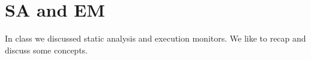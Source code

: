 
\graphicspath{ {./src/} } 
\usepackage{hyperref}

\newcommand{\dozent}{Volker Roth}
\newcommand{\tutor}{Oliver Wiese}
\newcommand{\tutoriumNo}{02\\Materialien: Latex, VSC, Skript}
\newcommand{\ubungNo}{03}
\newcommand{\veranstaltung}{Rechnersicherheit}
\newcommand{\semester}{SoSe 21}




\section{SA and EM}
In class we discussed static analysis and execution monitors. We like to recap and discuss some concepts.
